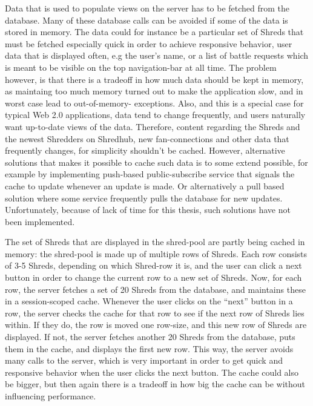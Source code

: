  Data that is used to populate views on the server has to be fetched from the database. Many of these database calls can be avoided if some of the data is stored in memory. The data could for instance be a particular set of Shreds that must be fetched especially quick in order to achieve responsive behavior, user data that is displayed often, e.g the user's name, or a list of battle requests which is meant to be visible on the top navigation-bar at all time. The problem however, is that there is a tradeoff in how much data should be kept in memory, as maintaing too much memory turned out to make the application slow, and in worst case lead to out-of-memory- exceptions. Also, and this is a special case for typical Web 2.0 applications, data tend to change frequently, and users naturally want up-to-date views of the data. Therefore, content regarding the Shreds and the newest Shredders on Shredhub, new fan-connections and other data that frequently changes, for simplicity shouldn't be cached. However, alternative solutions that makes it possible to cache such data is to some extend possible, for example by implementing push-based public-subscribe service that signals the cache to update whenever an update is made. Or alternatively a pull based solution where some service frequently pulls the database for new updates. Unfortunately, because of lack of time for this thesis, such solutions have not been implemented.

The set of Shreds that are displayed in the shred-pool are partly being cached in memory: the shred-pool is made up of multiple rows of Shreds. Each row consists of 3-5 Shreds, depending on which Shred-row it is, and the user can click a next button in order to change the current row to a new set of Shreds. Now, for each row, the server fetches a set of 20 Shreds from the database, and maintains these in a session-scoped cache. Whenever the user clicks on the ``next'' button in a row, the server checks the cache for that row to see if the next row of Shreds lies within. If they do, the row is moved one row-size, and this new row of Shreds are displayed. If not, the server fetches another 20 Shreds from the database, puts them in the cache, and displays the first new row. This way, the server avoids many calls to the server, which is very important in order to get quick and responsive behavior when the user clicks the next button. The cache could also be bigger, but then again there is a tradeoff in how big the cache can be without influencing performance. 


